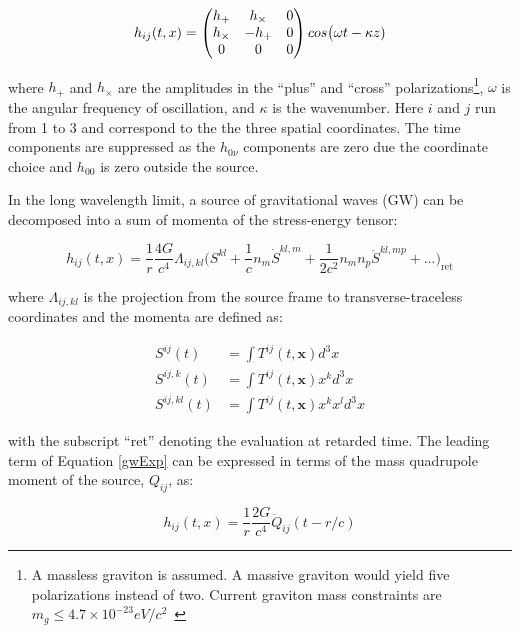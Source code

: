 \documentclass [12pt, proquest]{uwthesis}[2019]
\begin{document}
\begin{equation}
h_{ij}(t,x)=\begin{pmatrix} h_+ & h_\times & 0 \\ h_\times & -h_+ & 0 \\ 0 & 0 & 0\end{pmatrix} \\cos\big(\omega t - \kappa z)
\end{equation}

where $h_+$ and $h_\times$ are the amplitudes in the ``plus'' and ``cross'' polarizations\footnote{A massless graviton is assumed. A massive graviton would yield five polarizations instead of two. Current graviton mass constraints are $m_g\leq 4.7\times 10^{-23} eV/c^2$~\cite{graviton}}, $\omega$ is the angular frequency of oscillation, and $\kappa$ is the wavenumber. Here $i$ and $j$ run from 1 to 3 and correspond to the the three spatial coordinates. The time components are suppressed as the $h_{0\nu}$ components are zero due the coordinate choice and $h_{00}$ is zero outside the source. 

In the long wavelength limit, a source of gravitational waves (GW) can be decomposed into a sum of momenta of the stress-energy tensor:

\begin{equation}
h_{ij}(t,x)=\frac{1}{r}\frac{4 G}{c^4} \Lambda_{ij,kl} \bigg( S^{kl} +\frac{1}{c} n_m \dot{S}^{kl,m} +\frac{1}{2c^2} n_m n_p \ddot{S}^{kl,mp}+...\bigg)_\text{ret} \label{gwExp}
\end{equation}

where $\Lambda_{ij,kl}$ is the projection from the source frame to transverse-traceless coordinates and the momenta are defined as:

\begin{align}
S^{ij}(t)&=\int T^{ij}(t,\mathbf{x}) d^3x\\
S^{ij,k}(t)&=\int T^{ij}(t,\mathbf{x}) x^k d^3x\\
S^{ij,kl}(t)&=\int T^{ij}(t,\mathbf{x}) x^k x^l d^3x
\end{align}

with the subscript ``ret'' denoting the evaluation at retarded time. The leading term of Equation \ref{gwExp} can be expressed in terms of the mass quadrupole moment of the source, $Q_{ij}$, as:

\begin{equation}
h_{ij}(t,x)=\frac{1}{r}\frac{2 G}{c^4} \ddot{Q}_{ij}(t-r/c)
\end{equation}
\end{document}
